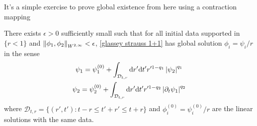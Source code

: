 \documentclass[11pt, oneside]{amsart}
\begin{document}
	It's a simple exercise to prove global existence from here using a contraction mapping
	\begin{theorem}\label{strauss glassey main theorem}
		There exists $\epsilon>0$ sufficiently small such that for all initial data supported in $\{r<1\}$ and $\left\lVert \phi_1,\phi_2\right\rVert_{W^{2,\infty}}<\epsilon$, \eqref{glassey strauss 1+1} has global solution $\phi_i=\psi_i/r$ in the sense
		\begin{equation}\label{gs weak sol}
			\begin{gathered}
				\psi_1=\psi_1^{(0)}+\int_{\mathcal{D}_{t,r}}\mathrm{d} r'\mathrm{d} t' r'^{1-q_1}\left\lvert \psi_2\right\rvert^{q_1}\\
				\psi_2=\psi_2^{(0)}+\int_{\mathcal{D}_{t,r}}\mathrm{d} r'\mathrm{d} t' r'^{1-q_2}\left\lvert \partial_t\psi_1\right\rvert^{q_2}
			\end{gathered}
		\end{equation}
	where $\mathcal{D}_{t,r}=\{(r',t'):t-r\leq t'+r'\leq t+r\}$ and $\phi_i^{(0)}=\psi_i^{(0)}/r$ are the linear solutions with the same data.
	\end{theorem}
\end{document}

